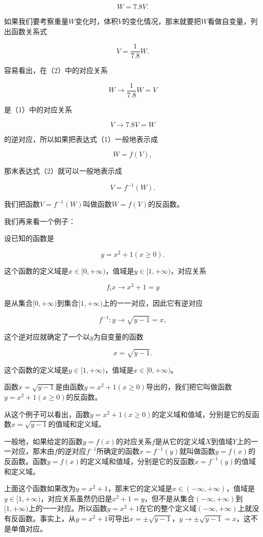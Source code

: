 \[
W = 7.8 V. \tag {1}
\]

如果我们要考察重量\(W\)变化时，体积\(V\)的变化情况，那末就要把\(W\)看做自变量，列出函数关系式

\[
V = \frac{1}{7.8} W. \tag {2}
\]

容易看出，在（2）中的对应关系

\[
W \rightarrow \frac{1}{7.8} W = V
\]

是（1）中的对应关系

\[
V \rightarrow 7.8 V = W
\]

的逆对应，所以如果把表达式（1）一般地表示成

\[
W = f (V),
\]

那末表达式（2）就可以一般地表示成

\[
V = f^{- 1} (W).
\]

我们把函数\(V = f^{-1}(W)\)叫做函数\(W = f(V)\)的反函数。

我们再来看一个例子：

设已知的函数是

\[
y = x^{2} + 1 (x \geqslant 0). \tag {3}
\]

这个函数的定义域是\(x \in [0, +\infty)\)，值域是\(y \in [1, +\infty)\)，对应关系

\[
f_{i} x \rightarrow x^{2} + 1 = y
\]

是从集合\([0, +\infty)\)到集合\([1, +\infty)\)上的一一对应，因此它有逆对应

\[
f^{-1}: y\rightarrow \sqrt{y-1}=x,
\]

这个逆对应就确定了一个以\(y\)为自变量的函数

\[
x = \sqrt{y - 1}.
\]

这个函数的定义域是\(y \in [1, +\infty)\)，值域是\(x \in [0, +\infty)\)。

函数\(x=\sqrt{y-1}\)是由函数\(y = x^2 + 1 (x \geqslant 0)\)导出的，我们把它叫做函数\(y = x^2 + 1 (x \geqslant 0)\)的反函数。

从这个例子可以看出，函数\(y = x^{2} + 1 (x \geqslant 0)\)的定义域和值域，分别是它的反函数\(x = \sqrt{y - 1}\)的值域和定义域。

一般地，如果给定的函数\(y = f(x)\)的对应关系\(f\)是从它的定义域\(X\)到值域\(Y\)上的一一对应，那末由\(f\)的逆对应\(f^{-1}\)所确定的函数\(x=f^{-1}(y)\)就叫做函数\(y = f(x)\)的反函数。函数\(y = f(x)\)的定义域和值域，分别是它的反函数\(x=f^{-1}(y)\)的值域和定义域。

上面这个函数如果改为\(y=x^2+1\)，那末它的定义域是\(x \in (-\infty, +\infty)\)，值域是\(y \in [1, +\infty)\)，对应关系虽然仍旧是\(x^2+1=y\)，但不是从集合\((-\infty, +\infty)\)到\([1, +\infty)\)上的一一对应。所以函数\(y=x^2+1\)在它的整个定义域\((-\infty, +\infty)\)上就没有反函数。事实上，从\(y = x^2 + 1\)可导出\(x = \pm \sqrt{y - 1}\)，\(y \to \pm \sqrt{y - 1} = x\)，这不是单值对应。

